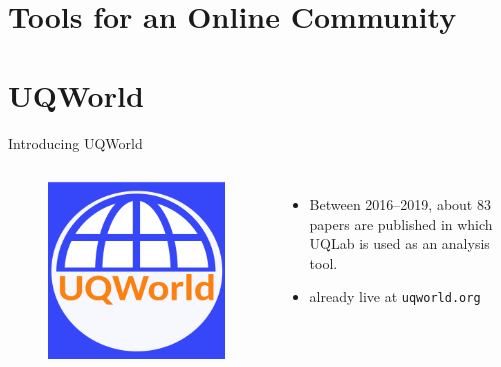 \documentclass[]{rsuqbeamernew}
\begin{document}
\section{Tools for an Online Community}

\section{UQWorld}

\begin{frame}[t]{Introducing UQWorld}
  
  \begin{columns}
    \begin{minipage}[c][0.85\textheight][c]{\linewidth}
      \begin{figure}
        \centering
        \includegraphics[width=1.0\linewidth]{../figures/uqworld_logo.png}
      \end{figure}
    \end{minipage}
      
    \begin{itemize}
      \item Between 2016--2019, about 83 papers are published in which UQLab is used as an analysis tool.
      \item already live at \texttt{uqworld.org}
    \end{itemize}
    \hfill
  \end{columns}

\end{frame}
\end{document}
